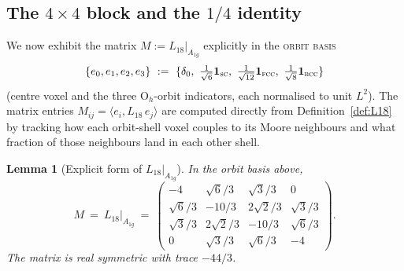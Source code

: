 \documentclass[11pt,reqno]{amsart}
\theoremstyle{plain}
\newtheorem{lemma}[theorem]{Lemma}
\theoremstyle{definition}
\theoremstyle{remark}
\numberwithin{equation}{section}
\newcommand{\Ohgrp}{\mathrm{O}_h}
\newcommand{\Aoneg}{A_{1g}}
\begin{document}
\subsection{The $4 \times 4$ block and the $1/4$ identity}

We now exhibit the matrix $M := L_{18}|_{\Aoneg}$ explicitly in the
\textsc{orbit basis}
\[
  \{e_{0}, e_{1}, e_{2}, e_{3}\}\ :=\
  \{\delta_{0},\ \tfrac{1}{\sqrt{6}}\mathbf{1}_{\textsc{sc}},\
  \tfrac{1}{\sqrt{12}}\mathbf{1}_{\textsc{fcc}},\
  \tfrac{1}{\sqrt{8}}\mathbf{1}_{\textsc{bcc}}\}
\]
(centre voxel and the three $\Ohgrp$-orbit indicators, each
normalised to unit $L^{2}$). The matrix entries
$M_{ij} = \langle e_{i}, L_{18}\, e_{j}\rangle$ are computed
directly from Definition~\ref{def:L18} by tracking how each
orbit-shell voxel couples to its Moore neighbours and what fraction
of those neighbours land in each other shell.

\begin{lemma}[Explicit form of $L_{18}|_{\Aoneg}$]
\label{lem:Lblock}
In the orbit basis above,
\begin{equation}
\label{eq:Lblock}
  M\ =\ L_{18}|_{\Aoneg}\ =\ \begin{pmatrix}
    -4              & \sqrt{6}/3      & \sqrt{3}/3       & 0               \\
    \sqrt{6}/3      & -10/3           & 2\sqrt{2}/3      & \sqrt{3}/3      \\
    \sqrt{3}/3      & 2\sqrt{2}/3     & -10/3            & \sqrt{6}/3      \\
    0               & \sqrt{3}/3      & \sqrt{6}/3       & -4
  \end{pmatrix}.
\end{equation}
The matrix is real symmetric with trace $-44/3$.
\end{lemma}
\end{document}
